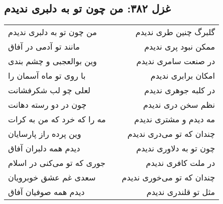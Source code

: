 \begin{center}
\section*{غزل ۳۸۲: من چون تو به دلبری ندیدم}
\label{sec:382}
\begin{longtable}{l p{0.5cm} r}
من چون تو به دلبری ندیدم
&&
گلبرگ چنین طری ندیدم
\\
مانند تو آدمی در آفاق
&&
ممکن نبود پری ندیدم
\\
وین بوالعجبی و چشم بندی
&&
در صنعت سامری ندیدم
\\
با روی تو ماه آسمان را
&&
امکان برابری ندیدم
\\
لعلی چو لب شکرفشانت
&&
در کلبه جوهری ندیدم
\\
چون در دو رسته دهانت
&&
نظم سخن دری ندیدم
\\
مه را که خرد که من به کرات
&&
مه دیدم و مشتری ندیدم
\\
وین پرده راز پارسایان
&&
چندان که تو می‌دری ندیدم
\\
دیدم همه دلبران آفاق
&&
چون تو به دلاوری ندیدم
\\
جوری که تو می‌کنی در اسلام
&&
در ملت کافری ندیدم
\\
سعدی غم عشق خوبرویان
&&
چندان که تو می‌خوری ندیدم
\\
دیدم همه صوفیان آفاق
&&
مثل تو قلندری ندیدم
\\
\end{longtable}
\end{center}
